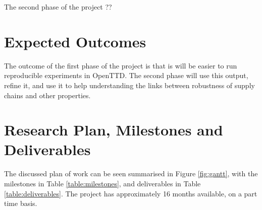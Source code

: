 \documentclass[a4paper,11pt]{article}
\begin{document}
The second phase of the project ??

\section{Expected Outcomes}

The outcome of the first phase of the project is that is will be easier to run reproducible experiments in OpenTTD. The second phase will use this output, refine it, and use it to help understanding the links between robustness of supply chains and other properties.

\section{Research Plan, Milestones and Deliverables}

The discussed plan of work can be seen summarised in Figure \ref{fig:gantt}, with the milestones in Table \ref{table:milestones}, and deliverables in Table \ref{table:deliverables}. The project has approximately 16 months available, on a part time basis.
\end{document}
